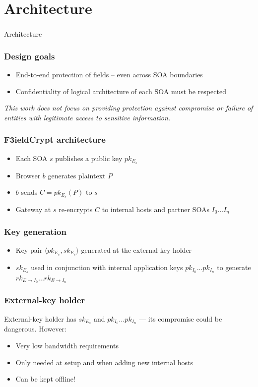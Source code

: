 \documentclass{beamer}
\begin{document}
\section{Architecture}
\begin{frame}
\frametitle{}
\begin{center}
\Large{Architecture}
\end{center}
\end{frame}

\begin{frame}
\frametitle{Design goals}
\begin{itemize}
\item End-to-end protection of fields -- even across SOA boundaries
\item Confidentiality of logical architecture of each SOA must be respected
\end{itemize}
\medskip
\small{\emph{This work does not focus on providing protection against
compromise or failure of entities with legitimate access to sensitive
information.}}
\end{frame}

\begin{frame}
\frametitle{F3ieldCrypt architecture}
\begin{itemize}
\item Each SOA $s$ publishes a public key $pk_{E_s}$
\item Browser $b$ generates plaintext $P$
\item $b$ sends $C = pk_{E_s}(P)$ to $s$
\item Gateway at $s$ re-encrypts $C$ to internal hosts and partner SOAs
$I_0...I_n$ 
\end{itemize}
\end{frame}

\begin{frame}
\frametitle{Key generation}
\begin{itemize}
\item Key pair $\langle pk_{E_s}, sk_{E_s} \rangle$ generated at the
\alert{external-key holder}
\item $sk_{E_s}$ used in conjunction with internal application keys
$pk_{I_0}...pk_{I_n}$ to generate $rk_{E \to I_0}...rk_{E \to I_n}$
\end{itemize}
\end{frame}

\begin{frame}
\frametitle{External-key holder}
External-key holder has $sk_{E_s}$ and $pk_{I_0}...pk_{I_n}$ --- its compromise
could be dangerous.  However:
\smallskip
\begin{itemize}
\item Very low bandwidth requirements
\item Only needed at setup and when adding new internal hosts
\item Can be kept offline!
\end{itemize}
\end{frame}
\end{document}
